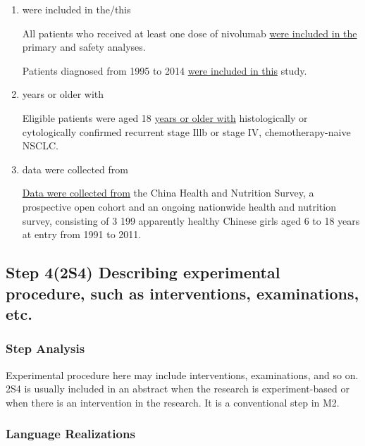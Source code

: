 \documentclass[a4paper]{ctexbook}
\begin{document}
    \begin{enumerate}
      \item were included in the/this
      \begin{eg}{}
        All patients who received at least one dose of nivolumab \uline{were included in the} primary and safety analyses.
      \end{eg}
        
      \begin{eg}{}
        Patients diagnosed from 1995 to 2014 \uline{were included in this} study.
      \end{eg}

      \item years or older with
      \begin{eg}{}
        Eligible patients were aged 18 \uline{years or older with} histologically or cytologically confirmed recurrent stage Illb or stage IV, chemotherapy-naive NSCLC.
      \end{eg}

      \item data were collected from
      \begin{eg}{}
        \uline{Data were collected from} the China Health and Nutrition Survey, a prospective open cohort and an ongoing nationwide health and nutrition survey, consisting of 3 199 apparently healthy Chinese girls aged 6 to 18 years at entry from 1991 to 2011.
      \end{eg}
    \end{enumerate}

  \subsection{Step 4(2S4) Describing experimental procedure, such as interventions, examinations, etc.}

    \subsubsection{Step Analysis}

    Experimental procedure here may include interventions, examinations, and so on. 2S4 is usually included in an abstract when the research is experiment-based or when there is an intervention in the research. It is a conventional step in M2.

    \subsubsection{Language Realizations}
\end{document}
